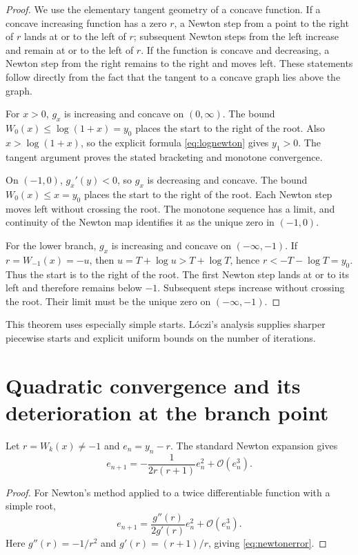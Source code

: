 \documentclass[11pt,openany]{book}
\newcommand{\bigO}{\mathcal{O}}
\theoremstyle{plain}
\theoremstyle{definition}
\theoremstyle{remark}
\begin{document}
\begin{proof}
We use the elementary tangent geometry of a concave function.  If a concave
increasing function has a zero \(r\), a Newton step from a point to the right
of \(r\) lands at or to the left of \(r\); subsequent Newton steps from the
left increase and remain at or to the left of \(r\).  If the function is
concave and decreasing, a Newton step from the right remains to the right and
moves left.  These statements follow directly from the fact that the tangent
to a concave graph lies above the graph.

For \(x>0\), \(g_x\) is increasing and concave on \((0,\infty)\).
The bound \(W_0(x)\le\log(1+x)=y_0\) places the start to the right of the
root.  Also \(x>\log(1+x)\), so the explicit formula
\eqref{eq:lognewton} gives \(y_1>0\).  The tangent argument proves the stated
bracketing and monotone convergence.

On \((-1,0)\), \(g_x'(y)<0\), so \(g_x\) is decreasing and concave.  The
bound \(W_0(x)\le x=y_0\) places the start to the right of the root.  Each
Newton step moves left without crossing the root.  The monotone sequence has a
limit, and continuity of the Newton map identifies it as the unique zero in
\((-1,0)\).

For the lower branch, \(g_x\) is increasing and concave on
\(( -\infty,-1)\).  If \(r=W_{-1}(x)=-u\), then
\(u=T+\log u>T+\log T\), hence
\(r<-T-\log T=y_0\).  Thus the start is to the right of the root.  The first
Newton step lands at or to its left and therefore remains below \(-1\).
Subsequent steps increase without crossing the root.  Their limit must be the
unique zero on \(( -\infty,-1)\).
\end{proof}

This theorem uses especially simple starts.  L\'{o}czi's analysis
\cite{Loczi2022} supplies sharper piecewise starts and explicit uniform bounds
on the number of iterations.

\section[Quadratic convergence near the branch point]{Quadratic convergence and its deterioration at the branch point}
Let \(r=W_k(x)\ne-1\) and \(e_n=y_n-r\).  The standard Newton expansion gives
\begin{equation}\label{eq:newtonerror}
 e_{n+1}=-\frac{1}{2r(r+1)}e_n^2+\bigO(e_n^3).
\end{equation}

\begin{proof}
For Newton's method applied to a twice differentiable function with a simple
root,
\[
 e_{n+1}=\frac{g''(r)}{2g'(r)}e_n^2+\bigO(e_n^3).
\]
Here \(g''(r)=-1/r^2\) and
\(g'(r)=(r+1)/r\), giving \eqref{eq:newtonerror}.
\end{proof}
\end{document}
